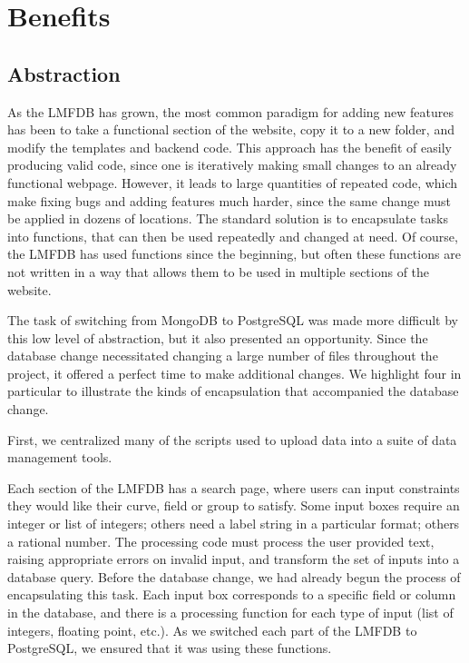 \documentclass{article}
\begin{document}
\section{Benefits}

\subsection{Abstraction}

As the LMFDB has grown, the most common paradigm for adding new features has been to take a functional section of the website, copy it to a new folder, and modify the templates and backend code.
This approach has the benefit of easily producing valid code, since one is iteratively making small changes to an already functional webpage.
However, it leads to large quantities of repeated code, which make fixing bugs and adding features much harder, since the same change must be applied in dozens of locations.
The standard solution is to encapsulate tasks into functions, that can then be used repeatedly and changed at need.
Of course, the LMFDB has used functions since the beginning, but often these functions are not written in a way that allows them to be used in multiple sections of the website.

The task of switching from MongoDB to PostgreSQL was made more difficult by this low level of abstraction, but it also presented an opportunity.
Since the database change necessitated changing a large number of files throughout the project, it offered a perfect time to make additional changes.
We highlight four in particular to illustrate the kinds of encapsulation that accompanied the database change.

First, we centralized many of the scripts used to upload data into a suite of data management tools. 

Each section of the LMFDB has a search page, where users can input constraints they would like their curve, field or group to satisfy.
Some input boxes require an integer or list of integers; others need a label string in a particular format; others a rational number.
The processing code must process the user provided text, raising appropriate errors on invalid input, and transform the set of inputs into a database query.
Before the database change, we had already begun the process of encapsulating this task.
Each input box corresponds to a specific field or column in the database, and there is a processing function for each type of input (list of integers, floating point, etc.).
As we switched each part of the LMFDB to PostgreSQL, we ensured that it was using these functions.
\end{document}
